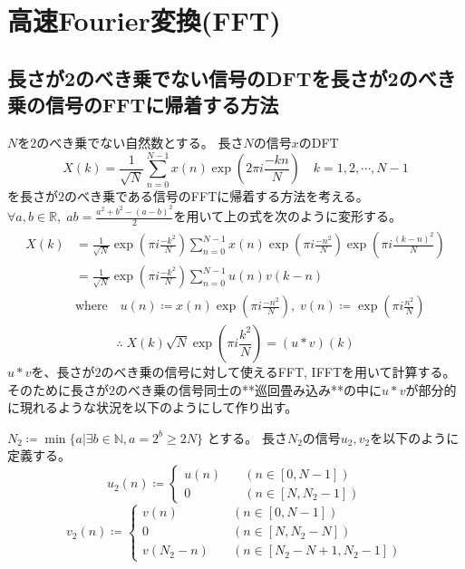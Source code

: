 \chapter{高速Fourier変換(FFT)}
    \section{長さが2のべき乗でない信号のDFTを長さが2のべき乗の信号のFFTに帰着する方法}
        $N$を$2$のべき乗でない自然数とする。
        長さ$N$の信号$x$のDFT
        \[ X(k) = \frac{1}{\sqrt{N}} \sum_{n=0}^{N-1} x(n)\exp \left(2\pi i\frac{-kn}{N}\right) \quad k=1,2,\cdots,N-1 \]
        を長さが$2$のべき乗である信号のFFTに帰着する方法を考える。
        $\forall a,b\in\mathbb{R},\;ab = \frac{a^2 + b^2 - (a-b)^2}{2}$を用いて上の式を次のように変形する。
        \begin{align*}
            \begin{aligned}
                X(k) &= \frac{1}{\sqrt{N}} \exp \left(\pi i\frac{-k^2}{N}\right) \sum_{n=0}^{N-1} x(n)\exp \left(\pi i\frac{-n^2}{N}\right) \exp \left(\pi i\frac{(k-n)^2}{N}\right) \\
                &= \frac{1}{\sqrt{N}} \exp \left(\pi i\frac{-k^2}{N}\right) \sum_{n=0}^{N-1} u(n)v(k-n) \\
                & \text{where} \quad u(n) \coloneqq x(n)\exp \left(\pi i\frac{-n^2}{N}\right),\;v(n) \coloneqq \exp \left(\pi i\frac{n^2}{N}\right)
            \end{aligned}
        \end{align*}
        \[ \therefore\; X(k)\sqrt{N} \exp \left(\pi i\frac{k^2}{N}\right) = (u*v)(k) \]
        $u*v$を、長さが$2$のべき乗の信号に対して使えるFFT, IFFTを用いて計算する。
        そのために長さが$2$のべき乗の信号同士の**巡回畳み込み**の中に$u*v$が部分的に現れるような状況を以下のようにして作り出す。
        \par
        $N_2 \coloneqq \min\{a|\exists b\in \mathbb{N}, a = 2^b \geq 2N\}$ とする。
        長さ$N_2$の信号$u_2,v_2$を以下のように定義する。
        \[
            u_2(n) \coloneqq \left\{
                \begin{aligned}
                    u(n) &\quad (n \in [0,N-1]) \\
                    0 &\quad (n \in [N,N_2-1])
                \end{aligned}
            \right.
        \]
        \[
            v_2(n) \coloneqq \left\{
                \begin{aligned}
                    v(n) &\quad (n \in [0,N-1]) \\
                    0 &\quad (n\in [N,N_2-N]) \\
                    v(N_2-n) &\quad (n \in [N_2-N+1,N_2-1])
                \end{aligned}
            \right.
        \]
